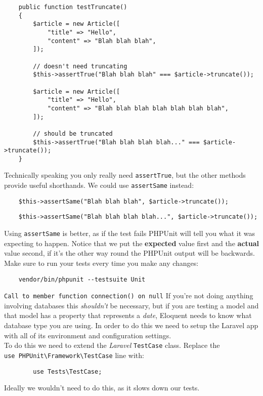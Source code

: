 \begin{verbatim}
    public function testTruncate()
    {
        $article = new Article([
            "title" => "Hello",
            "content" => "Blah blah blah",
        ]);

        // doesn't need truncating
        $this->assertTrue("Blah blah blah" === $article->truncate());

        $article = new Article([
            "title" => "Hello",
            "content" => "Blah blah blah blah blah blah blah",
        ]);

        // should be truncated
        $this->assertTrue("Blah blah blah blah..." === $article->truncate());
    }
\end{verbatim}

Technically speaking you only really need \texttt{assertTrue}, but the other methods provide useful shorthands. We could use \texttt{assertSame} instead:

\begin{verbatim}
    $this->assertSame("Blah blah blah", $article->truncate());
\end{verbatim}

\begin{verbatim}
    $this->assertSame("Blah blah blah blah...", $article->truncate());
\end{verbatim}

Using \texttt{assertSame} is better, as if the test fails PHPUnit will tell you what it was expecting to happen. Notice that we put the \textbf{expected} value first and the \textbf{actual} value second, if it's the other way round the PHPUnit output will be backwards.
\\

Make sure to run your tests every time you make any changes:

\begin{verbatim}
    vendor/bin/phpunit --testsuite Unit
\end{verbatim}


\begin{infobox}{\texttt{Call to member function connection() on null}}
    If you're not doing anything involving databases this \textit{shouldn't} be necessary, but if you are testing a model and that model has a property that represents a \textit{date}, Eloquent needs to know what database type you are using. In order to do this we need to setup the Laravel app with all of its environment and configuration settings.
    \\

    To do this we need to extend the \textit{Laravel} \texttt{TestCase} class. Replace the \\ \texttt{use PHPUnit\textbackslash{}Framework\textbackslash{}TestCase} line with:

    \begin{verbatim}
        use Tests\TestCase;
    \end{verbatim}

    Ideally we wouldn't need to do this, as it slows down our tests.
\end{infobox}



